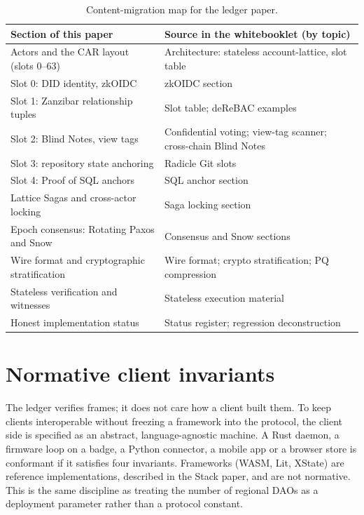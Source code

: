 \documentclass[a4paper,11pt,twoside,parskip=half-,headings=small]{scrartcl}
\begin{document}
\begin{table}[H]
\centering\small
\begin{tabularx}{\textwidth}{@{}L{4.6cm}Y@{}}
\toprule
\textbf{Section of this paper} & \textbf{Source in the whitebooklet (by topic)} \\
\midrule
Actors and the CAR layout (slots 0--63) & Architecture: stateless account-lattice, slot table \\
Slot 0: DID identity, zkOIDC & zkOIDC section \\
Slot 1: Zanzibar relationship tuples & Slot table; deReBAC examples \\
Slot 2: Blind Notes, view tags & Confidential voting; view-tag scanner; cross-chain Blind Notes \\
Slot 3: repository state anchoring & Radicle Git slots \\
Slot 4: Proof of SQL anchors & SQL anchor section \\
Lattice Sagas and cross-actor locking & Saga locking section \\
Epoch consensus: Rotating Paxos and Snow & Consensus and Snow sections \\
Wire format and cryptographic stratification & Wire format; crypto stratification; PQ compression \\
Stateless verification and witnesses & Stateless execution material \\
Honest implementation status & Status register; regression deconstruction \\
\bottomrule
\end{tabularx}
\caption{Content-migration map for the ledger paper.}
\end{table}

\section{Normative client invariants}
\label{sec:client_invariants}

The ledger verifies frames; it does not care how a client built them. To keep clients interoperable without freezing a framework into the protocol, the client side is specified as an abstract, language-agnostic machine. A Rust daemon, a firmware loop on a badge, a Python connector, a mobile app or a browser store is conformant if it satisfies four invariants. Frameworks (WASM, Lit, XState) are reference implementations, described in the Stack paper, and are not normative. This is the same discipline as treating the number of regional DAOs as a deployment parameter rather than a protocol constant.
\end{document}
